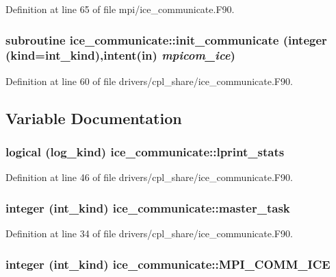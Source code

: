 Definition at line 65 of file mpi/ice\_\-communicate.F90.\hypertarget{namespaceice__communicate_a6588d53d155102d6df70bc1b3ad32b0b}{
\subsubsection[{init\_\-communicate}]{\setlength{\rightskip}{0pt plus 5cm}subroutine ice\_\-communicate::init\_\-communicate (integer (kind=int\_\-kind),intent(in) {\em mpicom\_\-ice})}}
\label{namespaceice__communicate_a6588d53d155102d6df70bc1b3ad32b0b}


Definition at line 60 of file drivers/cpl\_\-share/ice\_\-communicate.F90.

\subsection{Variable Documentation}
\hypertarget{namespaceice__communicate_a6dd078fb822abac232bfb22bab20ec64}{
\subsubsection[{lprint\_\-stats}]{\setlength{\rightskip}{0pt plus 5cm}logical (log\_\-kind) {\bf ice\_\-communicate::lprint\_\-stats}}}
\label{namespaceice__communicate_a6dd078fb822abac232bfb22bab20ec64}


Definition at line 46 of file drivers/cpl\_\-share/ice\_\-communicate.F90.\hypertarget{namespaceice__communicate_a769a45947743f12c592e4cef37a18b6c}{
\subsubsection[{master\_\-task}]{\setlength{\rightskip}{0pt plus 5cm}integer (int\_\-kind) {\bf ice\_\-communicate::master\_\-task}}}
\label{namespaceice__communicate_a769a45947743f12c592e4cef37a18b6c}


Definition at line 34 of file drivers/cpl\_\-share/ice\_\-communicate.F90.\hypertarget{namespaceice__communicate_ad2224da9473c4376695684ddb19ec66f}{
\subsubsection[{MPI\_\-COMM\_\-ICE}]{\setlength{\rightskip}{0pt plus 5cm}integer (int\_\-kind) {\bf ice\_\-communicate::MPI\_\-COMM\_\-ICE}}}
\label{namespaceice__communicate_ad2224da9473c4376695684ddb19ec66f}


